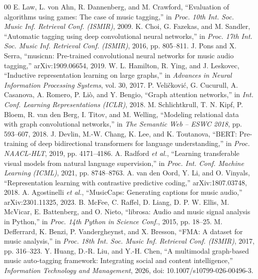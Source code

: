 \documentclass[conference]{IEEEtran}
\begin{document}
\begin{thebibliography}{00}
 E. Law, L. von Ahn, R. Dannenberg, and M. Crawford, ``Evaluation of algorithms using games: The case of music tagging,'' in \emph{Proc. 10th Int. Soc. Music Inf. Retrieval Conf. (ISMIR)}, 2009.
 K. Choi, G. Fazekas, and M. Sandler, ``Automatic tagging using deep convolutional neural networks,'' in \emph{Proc. 17th Int. Soc. Music Inf. Retrieval Conf. (ISMIR)}, 2016, pp. 805--811.
 J. Pons and X. Serra, ``musicnn: Pre-trained convolutional neural networks for music audio tagging,'' arXiv:1909.06654, 2019.
 W. L. Hamilton, R. Ying, and J. Leskovec, ``Inductive representation learning on large graphs,'' in \emph{Advances in Neural Information Processing Systems}, vol. 30, 2017.
 P. Veli\v{c}kovi\'c, G. Cucurull, A. Casanova, A. Romero, P. Li\`o, and Y. Bengio, ``Graph attention networks,'' in \emph{Int. Conf. Learning Representations (ICLR)}, 2018.
 M. Schlichtkrull, T. N. Kipf, P. Bloem, R. van den Berg, I. Titov, and M. Welling, ``Modeling relational data with graph convolutional networks,'' in \emph{The Semantic Web -- ESWC 2018}, pp. 593--607, 2018.
 J. Devlin, M.-W. Chang, K. Lee, and K. Toutanova, ``BERT: Pre-training of deep bidirectional transformers for language understanding,'' in \emph{Proc. NAACL-HLT}, 2019, pp. 4171--4186.
 A. Radford \emph{et al.}, ``Learning transferable visual models from natural language supervision,'' in \emph{Proc. Int. Conf. Machine Learning (ICML)}, 2021, pp. 8748--8763.
 A. van den Oord, Y. Li, and O. Vinyals, ``Representation learning with contrastive predictive coding,'' arXiv:1807.03748, 2018.
 A. Agostinelli \emph{et al.}, ``MusicCaps: Generating captions for music audio,'' arXiv:2301.11325, 2023.
 B. McFee, C. Raffel, D. Liang, D. P. W. Ellis, M. McVicar, E. Battenberg, and O. Nieto, ``librosa: Audio and music signal analysis in Python,'' in \emph{Proc. 14th Python in Science Conf.}, 2015, pp. 18--25.
 M. Defferrard, K. Benzi, P. Vandergheynst, and X. Bresson, ``FMA: A dataset for music analysis,'' in \emph{Proc. 18th Int. Soc. Music Inf. Retrieval Conf. (ISMIR)}, 2017, pp. 316--323.
 Y. Huang, D.-R. Liu, and Y.-H. Chen, ``A multimodal graph-based music auto-tagging framework: Integrating social and content intelligence,'' \emph{Information Technology and Management}, 2026, doi: 10.1007/s10799-026-00496-3.
\end{thebibliography}
\end{document}
